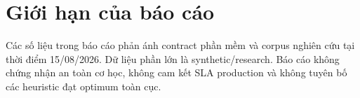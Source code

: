 \documentclass[12pt,a4paper]{article}
\begin{document}
\section*{Giới hạn của báo cáo}

Các số liệu trong báo cáo phản ánh contract phần mềm và corpus nghiên cứu tại thời điểm
15/08/2026. Dữ liệu phần lớn là synthetic/research. Báo cáo không chứng nhận an toàn cơ
học, không cam kết SLA production và không tuyên bố các heuristic đạt optimum toàn cục.
\end{document}
